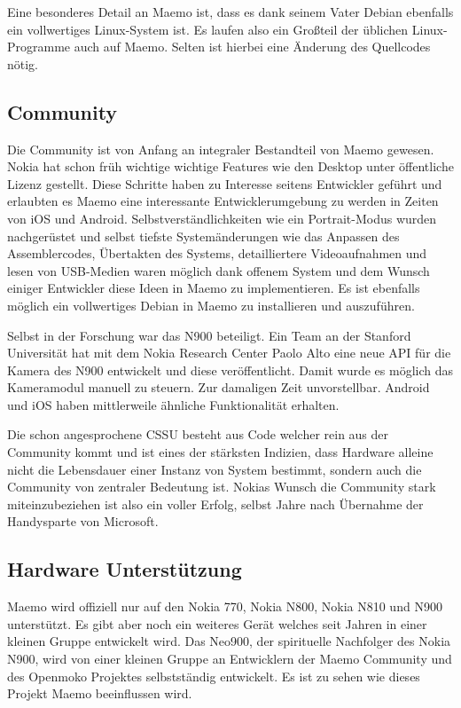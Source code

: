 Eine besonderes Detail an Maemo ist, dass es dank seinem Vater Debian ebenfalls ein vollwertiges Linux-System ist. Es laufen also ein Großteil der üblichen Linux-Programme auch auf Maemo. Selten ist hierbei eine Änderung des Quellcodes nötig.\\ 

\subsection{Community}
Die Community ist von Anfang an integraler Bestandteil von Maemo gewesen. Nokia hat schon früh wichtige wichtige Features wie den Desktop unter öffentliche Lizenz gestellt\cite{online:maemo-hildon}. Diese Schritte haben zu Interesse seitens Entwickler geführt und erlaubten es Maemo eine interessante Entwicklerumgebung zu werden in Zeiten von iOS und Android. Selbstverständlichkeiten wie ein Portrait-Modus wurden nachgerüstet\cite{online:maemo-portrait} und selbst tiefste Systemänderungen wie das Anpassen des Assemblercodes\cite{online:maemo-thumb}, Übertakten des Systems\cite{online:maemo-overclocking}, detailliertere Videoaufnahmen\cite{online:maemo-hdvideo} und lesen von USB-Medien\cite{online:maemo-usbhost}  waren möglich dank offenem System und dem Wunsch einiger Entwickler diese Ideen in Maemo zu implementieren. Es ist ebenfalls möglich ein vollwertiges Debian in Maemo zu installieren und auszuführen\cite{online:maemo-easydebian}\cite{online:maemo-easydebianwiki}.

Selbst in der Forschung war das N900 beteiligt. Ein Team an der Stanford Universität hat mit dem Nokia Research Center Paolo Alto eine neue API für die Kamera des N900 entwickelt und diese veröffentlicht\cite{online:maemo-fcam}. Damit wurde es möglich das Kameramodul manuell zu steuern. Zur damaligen Zeit unvorstellbar. Android und iOS haben mittlerweile ähnliche Funktionalität erhalten\cite{online:maemo-fcamlegacy}.

Die schon angesprochene CSSU besteht aus Code welcher rein aus der Community kommt und ist eines der stärksten Indizien, dass Hardware alleine nicht die Lebensdauer einer Instanz von System bestimmt, sondern auch die Community von zentraler Bedeutung ist. Nokias Wunsch die Community stark miteinzubeziehen ist also ein voller Erfolg, selbst Jahre nach Übernahme der Handysparte von Microsoft\cite{online:nokia-microsoft}.\\

\subsection{Hardware Unterstützung}
Maemo wird offiziell nur auf den Nokia 770\cite{online:maemo1-770}, Nokia N800\cite{online:n800-specs}, Nokia N810\cite{online:n810-specs} und N900\cite{online:n900-specs} unterstützt. Es gibt aber noch ein weiteres Gerät welches seit Jahren in einer kleinen Gruppe entwickelt wird. Das Neo900, der spirituelle Nachfolger des Nokia N900\cite{online:maemo-neo900}, wird von einer kleinen Gruppe an Entwicklern der Maemo Community und des Openmoko Projektes selbstständig entwickelt\cite{online:maemo-neo900team}. Es ist zu sehen wie dieses Projekt Maemo beeinflussen wird.\\

